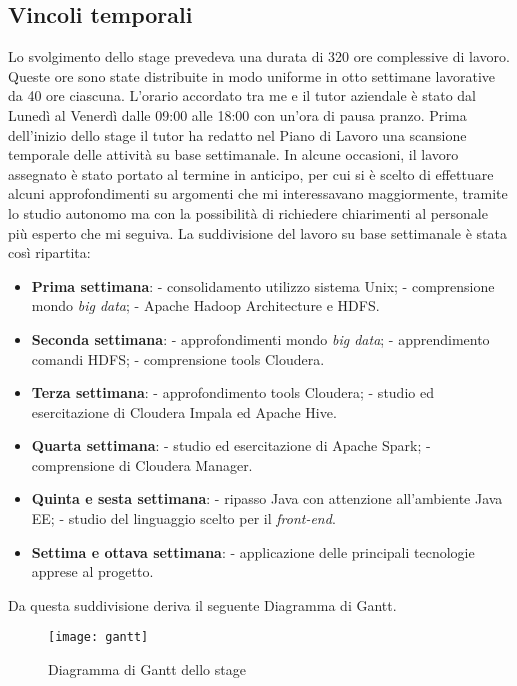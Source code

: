 \subsection{Vincoli temporali}
Lo svolgimento dello stage prevedeva una durata di 320 ore complessive di lavoro. Queste ore sono state distribuite in modo uniforme in otto settimane lavorative da 40 ore ciascuna. L'orario accordato tra me e il tutor aziendale è stato dal Lunedì al Venerdì dalle 09:00 alle 18:00 con un'ora di pausa pranzo. Prima dell'inizio dello stage il tutor ha redatto nel Piano di Lavoro una scansione temporale delle attività su base settimanale.
In alcune occasioni, il lavoro assegnato è stato portato al termine in anticipo, per cui si è scelto di effettuare alcuni approfondimenti su argomenti che mi interessavano maggiormente, tramite lo studio autonomo ma con la possibilità di richiedere chiarimenti al personale più esperto che mi seguiva.
La suddivisione del lavoro su base settimanale è stata così ripartita:
\begin{itemize}
	\item \textbf{Prima settimana}: 
		\subitem - consolidamento utilizzo sistema Unix;
		\subitem - comprensione mondo \textit{big data};
		\subitem - Apache Hadoop Architecture e HDFS.
	\item \textbf{Seconda settimana}:
		\subitem - approfondimenti mondo \textit{big data};
		\subitem - apprendimento comandi HDFS;
		\subitem - comprensione tools Cloudera.
	\item \textbf{Terza settimana}:
		\subitem - approfondimento tools Cloudera;
		\subitem - studio ed esercitazione di Cloudera Impala ed Apache Hive.
	\item \textbf{Quarta settimana}:
		\subitem - studio ed esercitazione di Apache Spark;
		\subitem - comprensione di Cloudera Manager.
	\item \textbf{Quinta e sesta settimana}:
	 	\subitem - ripasso Java con attenzione all'ambiente Java EE;
	 	\subitem - studio del linguaggio scelto per il \textit{front-end}.
	\item \textbf{Settima e ottava settimana}:
		\subitem - applicazione delle principali tecnologie apprese al progetto.
\end{itemize}
Da questa suddivisione deriva il seguente \gls{Diagramma di Gantt}.
\begin{figure}[!h] 
	\centering 
	\texttt{[image: gantt]}
	\caption{Diagramma di Gantt dello stage}
\end{figure}

